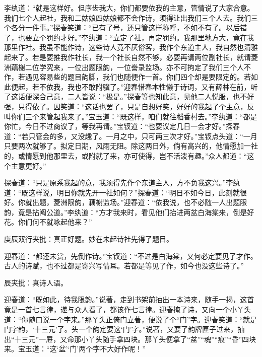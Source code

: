 \begin{parag}
\end{parag}


\begin{parag}
    李纨道：“就是这样好。但序齿我大，你们都要依我的主意，管情说了大家合意。我们七个人起社，我和二姑娘四姑娘都不会作诗，须得让出我们三个人去。我们三个各分一件事。”探春笑道：“已有了号，还只管这样称呼，不如不有了。以后错了，也要立个罚约才好。”李纨道：“立定了社，再定罚约。我那里地方大，竟在我那里作社。我虽不能作诗，这些诗人竟不厌俗客，我作个东道主人，我自然也清雅起来了。若是要推我作社长，我一个社长自然不够，必要再请两位副社长，就请菱洲藕榭二位学究来，一位出题限韵，一位誊录监场。亦不可拘定了我们三个人不作，若遇见容易些的题目韵脚，我们也随便作一首。你们四个却是要限定的。若如此便起，若不依我，我也不敢附骥了。”迎春惜春本性懒于诗词，又有薛林在前，听了这话便深合己意，二人皆说：“极是。”探春等也知此意，见他二人悦服，也不好强，只得依了。因笑道：“这话也罢了，只是自想好笑，好好的我起了个主意，反叫你们三个来管起我来了。”宝玉道：“既这样，咱们就往稻香村去。”李纨道：“都是你忙，今日不过商议了，等我再请。”宝钗道：“也要议定几日一会才好。”探春道：“若只管会的多，又没趣了。一月之中，只可两三次才好。”宝钗点头道：“一月只要两次就够了。拟定日期，风雨无阻。除这两日外，倘有高兴的，他情愿加一社的，或情愿到他那里去，或附就了来，亦可使得，岂不活泼有趣。”众人都道：“这个主意更好。”
\end{parag}


\begin{parag}
    探春道：“只是原系我起的意，我须得先作个东道主人，方不负我这兴。”李纨道：“既这样说，明日你就先开一社如何？”探春道：“明日不如今日，此刻就很好。你就出题，菱洲限韵，藕榭监场。”迎春道：“依我说，也不必随一人出题限韵，竟是拈阄公道。”李纨道：“方才我来时，看见他们抬进两盆白海棠来，倒是好花。你们何不就咏起他来？”\begin{note}庚辰双行夹批：真正好题。妙在未起诗社先得了题目。\end{note}迎春道：“都还未赏，先倒作诗。”宝钗道：“不过是白海棠，又何必定要见了才作。古人的诗赋，也不过都是寄兴写情耳。若都是等见了作，如今也没这些诗了。”\begin{note}辰夹批：真诗人语。\end{note}迎春道：“既如此，待我限韵。”说著，走到书架前抽出一本诗来，随手一揭，这首竟是一首七言律，递与众人看了，都该作七言律。迎春掩了诗，又向一个小丫头道：“你随口说一个字来。”那丫头正倚门立著，便说了个“门”字。迎春笑道：“就是门字韵，‘十三元’了。头一个韵定要这‘门’字。”说著，又要了韵牌匣子过来，抽出“十三元”一屉，又命那小丫头随手拿四块。那丫头便拿了“盆”“魂”“痕”“昏”四块来。宝玉道：“这‘盆’‘门’两个字不大好作呢！”
\end{parag}


